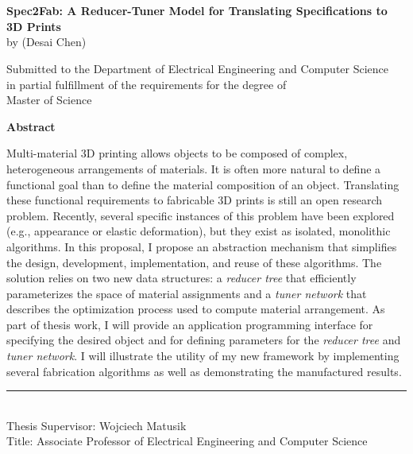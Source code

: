 \chapter*{}
\label{chap:abstract}
\begin{center}
\vspace{-8em}
{\large \textsf{\textbf{Spec2Fab: A Reducer-Tuner Model for Translating Specifications to 3D Prints}}} \\
by (Desai Chen)

\vspace{.2in}

Submitted to the Department of Electrical Engineering and Computer Science \\
in partial fulfillment of the requirements for the degree of \\
Master of Science \\ %
\end{center}

\noindent\textsf{\textbf{Abstract}}

\noindent Multi-material 3D printing allows objects to be composed of complex, heterogeneous arrangements of materials. It is often more natural to define a functional goal than to define the material composition of an object. Translating these functional requirements to fabricable 3D prints is still an open research problem. Recently, several specific instances of this problem have been explored (e.g.,  appearance or elastic deformation), but they exist as isolated, monolithic algorithms. In this proposal, I propose an abstraction mechanism that simplifies the design, development, implementation, and reuse of these algorithms. The solution relies on two new data structures: a \emph{reducer tree} that efficiently parameterizes the space of material assignments and a \emph{tuner network} that describes the optimization process used to compute material arrangement. As part of thesis work, I will provide an application programming interface for specifying the desired object and for defining parameters for the \emph{reducer tree} and \emph{tuner network}. I will illustrate the utility of my new framework by implementing several fabrication algorithms as well as demonstrating the manufactured results.

\noindent\rule[0.5ex]{2in}{1pt} \\
Thesis Supervisor: Wojciech Matusik\\
Title:  Associate Professor of Electrical Engineering and Computer Science



